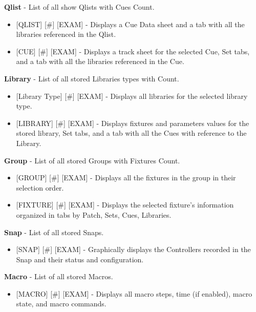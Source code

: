 \documentclass[
]{article}
\providecommand{\tightlist}{%
  \setlength{\itemsep}{0pt}\setlength{\parskip}{0pt}}
\begin{document}
\textbf{Qlist} - List of all show Qlists with Cues Count.

\begin{itemize}
\item
  {[}QLIST{]} {[}\#{]} {[}EXAM{]} - Displays a Cue Data sheet and a tab with all the libraries referenced in the Qlist.
\item
  {[}CUE{]} {[}\#{]} {[}EXAM{]} - Displays a track sheet for the selected Cue, Set tabs, and a tab with all the libraries referenced in the Cue.
\end{itemize}

\textbf{Library} - List of all stored Libraries types with Count.

\begin{itemize}
\item
  {[}Library Type{]} {[}\#{]} {[}EXAM{]} - Displays all libraries for the selected library type.
\item
  {[}LIBRARY{]} {[}\#{]} {[}EXAM{]} - Displays fixtures and parameters values for the stored library, Set tabs, and a tab with all the Cues with reference to the Library.
\end{itemize}

\textbf{Group} - List of all stored Groups with Fixtures Count.

\begin{itemize}
\item
  {[}GROUP{]} {[}\#{]} {[}EXAM{]} - Displays all the fixtures in the group in their selection order.
\item
  {[}FIXTURE{]} {[}\#{]} {[}EXAM{]} - Displays the selected fixture's information organized in tabs by Patch, Sets, Cues, Libraries.
\end{itemize}

\textbf{Snap} - List of all stored Snaps.

\begin{itemize}
\tightlist
\item
  {[}SNAP{]} {[}\#{]} {[}EXAM{]} - Graphically displays the Controllers recorded in the Snap and their status and configuration.
\end{itemize}

\textbf{Macro} - List of all stored Macros.

\begin{itemize}
\tightlist
\item
  {[}MACRO{]} {[}\#{]} {[}EXAM{]} - Displays all macro steps, time (if enabled), macro state, and macro commands.
\end{itemize}
\end{document}

